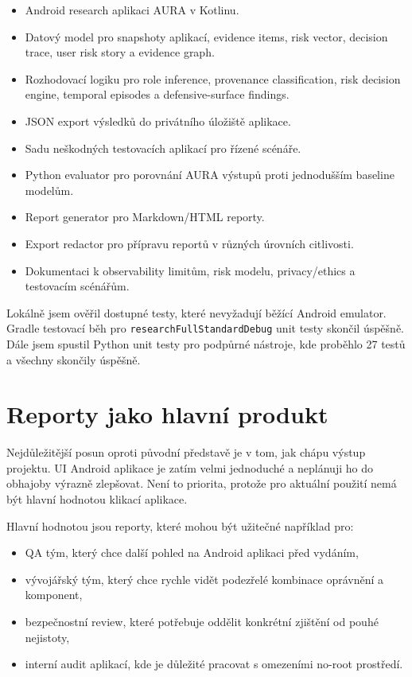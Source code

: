 \documentclass[11pt,a4paper]{article}
\begin{document}
\begin{itemize}
  \item Android research aplikaci AURA v Kotlinu.
  \item Datový model pro snapshoty aplikací, evidence items, risk vector, decision trace, user risk story a evidence graph.
  \item Rozhodovací logiku pro role inference, provenance classification, risk decision engine, temporal episodes a defensive-surface findings.
  \item JSON export výsledků do privátního úložiště aplikace.
  \item Sadu neškodných testovacích aplikací pro řízené scénáře.
  \item Python evaluator pro porovnání AURA výstupů proti jednodušším baseline modelům.
  \item Report generator pro Markdown/HTML reporty.
  \item Export redactor pro přípravu reportů v různých úrovních citlivosti.
  \item Dokumentaci k observability limitům, risk modelu, privacy/ethics a testovacím scénářům.
\end{itemize}

Lokálně jsem ověřil dostupné testy, které nevyžadují běžící Android emulator. Gradle testovací běh pro \texttt{researchFullStandardDebug} unit testy skončil úspěšně. Dále jsem spustil Python unit testy pro podpůrné nástroje, kde proběhlo 27 testů a všechny skončily úspěšně.

\section{Reporty jako hlavní produkt}

Nejdůležitější posun oproti původní představě je v tom, jak chápu výstup projektu. UI Android aplikace je zatím velmi jednoduché a neplánuji ho do obhajoby výrazně zlepšovat. Není to priorita, protože pro aktuální použití nemá být hlavní hodnotou klikací aplikace.

Hlavní hodnotou jsou reporty, které mohou být užitečné například pro:

\begin{itemize}
  \item QA tým, který chce další pohled na Android aplikaci před vydáním,
  \item vývojářský tým, který chce rychle vidět podezřelé kombinace oprávnění a komponent,
  \item bezpečnostní review, které potřebuje oddělit konkrétní zjištění od pouhé nejistoty,
  \item interní audit aplikací, kde je důležité pracovat s omezeními no-root prostředí.
\end{itemize}
\end{document}
